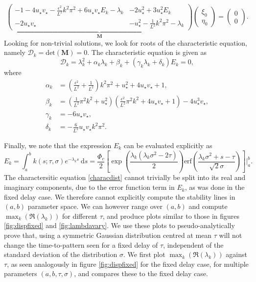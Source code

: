\begin{equation}
\underbrace{\begin{pmatrix}-1-4u_\star v_\star-\frac{\epsilon^2}{L^2}k^2\pi^2+6u_\star v_\star E_k-\lambda_k&-2u_\star^2+3u_\star^2E_k\\-2u_\star v_\star&-u_\star^2-\frac{1}{L^2}k^2\pi^2-\lambda_k \end{pmatrix}}_{\textbf{M}}\begin{pmatrix}\xi_0\\\eta_0\end{pmatrix}=\begin{pmatrix}0\\0\end{pmatrix}.
\end{equation}
Looking for non-trivial solutions, we look for roots of the characteristic equation, namely $\mathcal{D}_k=\text{det}(\textbf{M})=0$. The characteristic equation is given as
\begin{equation}\label{characdist}
  \mathcal{D}_k=\lambda_k^2+\alpha_k\lambda_k+\beta_k+(\gamma_k\lambda_k+\delta_k)E_k=0,
\end{equation}
where
\begin{equation}\label{characcoeff}
    \begin{split}
\alpha_k&=\left(\frac{\epsilon^2}{L^2}+\frac{1}{L^2}\right)k^2\pi^2+u_\star^2+4u_\star v_\star+1,\\
\beta_k&=\left(\frac{1}{L^2}\pi^2k^2+u_\star^2\right)\left(\frac{\epsilon^2}{L^2}\pi^2k^2+4u_\star v_\star+1\right)-4u_\star^3v_\star,\\
\gamma_k&=-6u_\star v_\star,\\
\delta_k&=-\frac{6}{L^2}u_\star v_\star k^2\pi^2.
\end{split}
\end{equation}

Finally, we note that the expression $E_k$ can be evaluated explicitly as
\begin{equation}
E_k=\int_a^bk(s;\tau,\sigma)e^{-\lambda_k s}\ \text{d}s=\frac{\Phi_c}{2}\left[\exp\left(\frac{\lambda_k(\lambda_k\sigma^2-2\tau)}{2}\right) \text{erf} \left(\frac{\lambda_k\sigma^2+s-\tau}{\sqrt{2}\sigma}\right)\right]\Bigg|_a^b.
\end{equation}
The charactersitic equation \eqref{characdist} cannot trivially be split into its real and imaginary components, due to the error function term in $E_k$, as was done in the fixed delay case. We therefore cannot explicitly compute the stability lines in $(a,b)$ parameter space. We can however range over $(a,b)$ and compute $\max_k(\Re(\lambda_k))$ for different $\tau$, and produce plots similar to those in figures \ref{fig:dispfixed} and \ref{fig:lambdavary}. We use these plots to pseudo-analytically prove that, using a symmetric Gaussian distribution centred at mean $\tau$ will not change the time-to-pattern seen for a fixed delay of $\tau$, independent of the standard deviation of the distribution $\sigma$. We first plot $\max_k(\Re(\lambda_k))$ against $\tau$, as seen analogously in figure \ref{fig:dispfixed} for the fixed delay case, for multiple parameters $(a,b,\tau,\sigma)$, and compares these to the fixed delay case.

